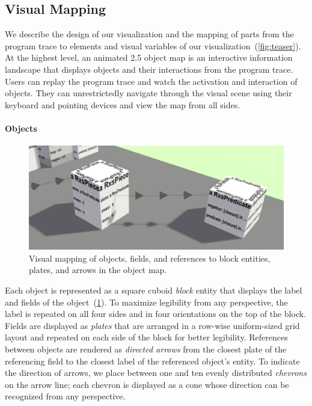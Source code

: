 \subsection{Visual Mapping}
\label{sec:visualization_approach/mapping}

We describe the design of our visualization and the mapping of parts from the program trace to elements and visual variables of our visualization~(\cref{fig:teaser}).
At the highest level, an animated 2.5 object map is an interactive information landscape that displays objects and their interactions from the program trace.
Users can replay the program trace and watch the activation and interaction of objects.
They can unrestrictedly navigate through the visual scene using their keyboard and pointing devices and view the map from all sides.

\paragraph{Objects}
\label{sec:visualization_approach/mapping/objects}

\begin{figure}[b!]
	\includegraphics[width=\linewidth]{sections/03_visualization_approach/mapping/objects}
	\caption{Visual mapping of objects, fields, and references to block entities, plates, and arrows in the object map.}
	\label{fig:visualization_approach/mapping/objects}
\end{figure}

Each object is represented as a square cuboid \emph{block} entity that displays the label and fields of the object~(\cref{fig:visualization_approach/mapping/objects}).
To maximize legibility from any perspective, the label is repeated on all four sides and in four orientations on the top of the block.
Fields are displayed as \emph{plates} that are arranged in a row-wise uniform-sized grid layout and repeated on each side of the block for better legibility.
References between objects are rendered as \emph{directed arrows} from the closest plate of the referencing field to the closest label of the referenced object's entity.
To indicate the direction of arrows, we place between one and ten evenly distributed \emph{chevrons} on the arrow line; each chevron is displayed as a cone whose direction can be recognized from any perspective.

